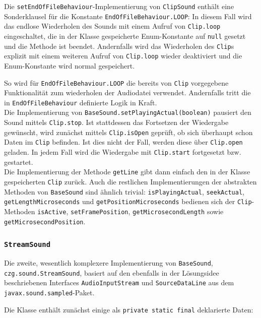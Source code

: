\begin{sloppypar}
Die \texttt{setEndOfFileBehaviour}-Implementierung von
\texttt{ClipSound} enthält eine Sonderklausel für die
Konstante \texttt{EndOfFileBehaviour.LOOP}: In diesem
Fall wird das endlose Wiederholen des Sounds mit einem
Aufruf von \texttt{Clip.loop} eingeschaltet, die in der
Klasse gespeicherte Enum-Konstante auf \texttt{null}
gesetzt und die Methode ist beendet. Andernfalls wird
das Wiederholen des \texttt{Clip}s explizit mit einem
weiteren Aufruf von \texttt{Clip.loop} wieder deaktiviert
und die Enum-Konstante wird normal gespeichert.

So wird für \texttt{EndOfFileBehaviour.LOOP} die bereits
von \texttt{Clip} vorgegebene Funktionalität zum wiederholen
der Audiodatei verwendet. Andernfalls tritt die in
\texttt{EndOfFileBehaviour} definierte Logik in Kraft.
\\

Die Implementierung von \texttt{BaseSound.setPlayingActual(boolean)}
pausiert den Sound mittels \texttt{Clip.stop}.
Ist stattdessen das Fortsetzen der Wiedergabe gewünscht, wird
zunächst mittels \texttt{Clip.isOpen} geprüft,
ob sich überhaupt schon Daten im \texttt{Clip} befinden.
Ist dies nicht der Fall, werden diese über \texttt{Clip.open}
geladen. In jedem Fall wird die Wiedergabe mit \texttt{Clip.start}
fortgesetzt bzw. gestartet.
\\

Die Implementierung der Methode \texttt{getLine} gibt
dann einfach den in der Klasse gespeicherten \texttt{Clip} zurück.
Auch die restlichen Implementierungen der abstrakten
Methoden von \texttt{BaseSound} sind ähnlich trivial:
\texttt{isPlayingActual}, \texttt{seekActual},
\texttt{getLengthMicroseconds} und \texttt{getPositionMicroseconds}
bedienen sich der \texttt{Clip}-Methoden \texttt{isActive},
\texttt{setFramePosition}, \texttt{getMicrosecondLength}
sowie \texttt{getMicrosecondPosition}.


\subsubsection{\texttt{StreamSound}}

Die zweite, wesentlich komplexere Implementierung von \texttt{BaseSound},
\texttt{czg.sound.StreamSound}, basiert auf den ebenfalls in der
Lösungsidee beschriebenen Interfaces \texttt{AudioInputStream} und
\texttt{SourceDataLine} aus dem \texttt{javax.sound.sampled}-Paket.

Die Klasse enthält zunächst einige als \texttt{private static final}
deklarierte Daten:


\end{sloppypar}
